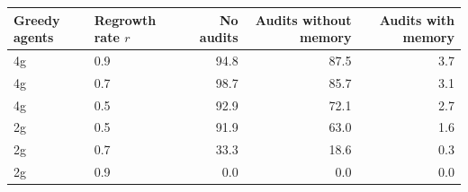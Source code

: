 \begin{tabular}{llrrr}
\toprule
Greedy agents & Regrowth rate $r$ & No audits & Audits without memory & Audits with memory \\
\midrule
4g & 0.9 & 94.8 & 87.5 & 3.7 \\
4g & 0.7 & 98.7 & 85.7 & 3.1 \\
4g & 0.5 & 92.9 & 72.1 & 2.7 \\
2g & 0.5 & 91.9 & 63.0 & 1.6 \\
2g & 0.7 & 33.3 & 18.6 & 0.3 \\
2g & 0.9 & 0.0 & 0.0 & 0.0 \\
\bottomrule
\end{tabular}
